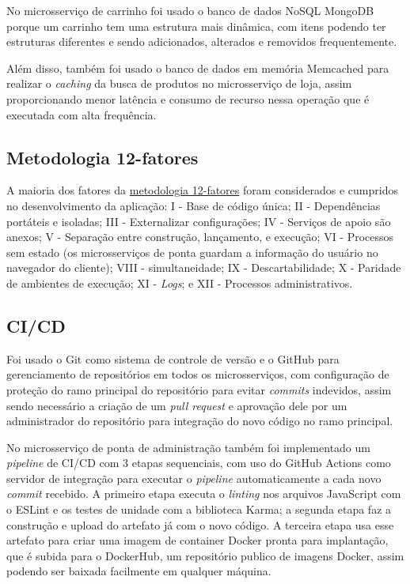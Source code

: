 No microsserviço de carrinho foi usado o banco de dados NoSQL MongoDB porque um carrinho tem uma estrutura mais dinâmica, com itens podendo ter estruturas diferentes e sendo adicionados, alterados e removidos frequentemente.

Além disso, também foi usado o banco de dados em memória Memcached para realizar o \emph{caching} da busca de produtos no microsserviço de loja, assim proporcionando menor latência e consumo de recurso nessa operação que é executada com alta frequência.

\subsection*{Metodologia 12-fatores}
A maioria dos fatores da \hyperref[metodologia-12-fatores]{metodologia 12-fatores} foram considerados e cumpridos no desenvolvimento da aplicação: I - Base de código única; II - Dependências portáteis e isoladas; III - Externalizar configurações; IV - Serviços de apoio são anexos; V - Separação entre construção, lançamento, e execução; VI - Processos sem estado (os microsserviços de ponta guardam a informação do usuário no navegador do cliente); VIII - simultaneidade; IX - Descartabilidade; X - Paridade de ambientes de execução; XI - \emph{Logs}; e XII - Processos administrativos.

\subsection*{CI/CD}
Foi usado o Git como sistema de controle de versão e o GitHub para gerenciamento de repositórios em todos os microsserviços, com configuração de proteção do ramo principal do repositório para evitar \emph{commits} indevidos, assim sendo necessário a criação de um \emph{pull request} e aprovação dele por um administrador do repositório para integração do novo código no ramo principal. 

No microsserviço de ponta de administração também foi implementado um \emph{pipeline} de CI/CD com 3 etapas sequenciais, com uso do GitHub Actions como servidor de integração para executar o \emph{pipeline} automaticamente a cada novo \emph{commit} recebido. A primeiro etapa executa o \emph{linting} nos arquivos JavaScript com o ESLint e os testes de unidade com a biblioteca Karma; a segunda etapa faz a construção e upload do artefato já com o novo código. A terceira etapa usa esse artefato para criar uma imagem de container Docker pronta para implantação, que é subida para o DockerHub, um repositório publico de imagens Docker, assim podendo ser baixada facilmente em qualquer máquina. 

